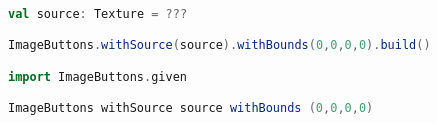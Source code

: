 \begin{lstlisting}[language=Scala, label=code:image-buttons-example, caption=Esempio di creazione di un ImageButton con e senza given conversion abilitata]

val source: Texture = ???

ImageButtons.withSource(source).withBounds(0,0,0,0).build()

import ImageButtons.given

ImageButtons withSource source withBounds (0,0,0,0)

\end{lstlisting}